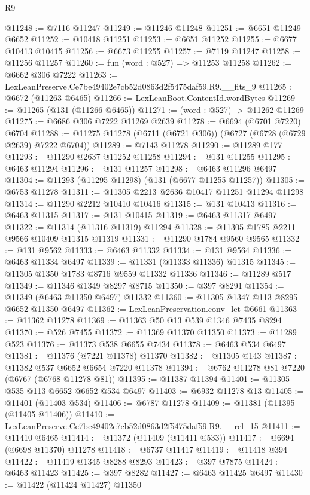 \begin{lexlean}{R9}
\begin{coremodule}
@11248 := @7116 @11247
@11249 := @11246 @11248
@11251 := @6651 @11249 @6652
@11252 := @10418 @11251
@11253 := @6651 @11252
@11255 := @6677 @10413 @10415
@11256 := @6673 @11255
@11257 := @7119 @11247
@11258 := @11256 @11257
@11260 := fun (word : @527) => @11253 @11258
@11262 := @6662 @306 @7222
@11263 := LexLeanPreserve.Ce7be49402e7cb52d0863d2f5475daf59.R9.__fits_9
@11265 := @6672 (@11263 @6465)
@11266 := LexLeanBoot.ContentId.wordBytes
@11269 := @11265 (@131 (@11266 @6465))
@11271 := (word : @527) -> @11262 @11269
@11275 := @6686 @306 @7222 @11269 @2639
@11278 := @6694 (@6701 @7220) @6704
@11288 := @11275 @11278 (@6711 (@6721 @306)) (@6727 (@6728 (@6729 @2639) @7222 @6704))
@11289 := @7143 @11278
@11290 := @11289 @177
@11293 := @11290 @2637 @11252 @11258
@11294 := @131 @11255
@11295 := @6463 @11294
@11296 := @131 @11257
@11298 := @6463 @11296 @6497
@11304 := @11293 (@11295 @11298) (@131 (@6677 @11255 @11257))
@11305 := @6753 @11278
@11311 := @11305 @2213 @2636 @10417 @11251 @11294 @11298
@11314 := @11290 @2212 @10410 @10416
@11315 := @131 @10413
@11316 := @6463 @11315
@11317 := @131 @10415
@11319 := @6463 @11317 @6497
@11322 := @11314 (@11316 @11319) @11294
@11328 := @11305 @1785 @2211 @9566 @10409 @11315 @11319
@11331 := @11290 @1784 @9560 @9565
@11332 := @131 @9562
@11333 := @6463 @11332
@11334 := @131 @9564
@11336 := @6463 @11334 @6497
@11339 := @11331 (@11333 @11336) @11315
@11345 := @11305 @1350 @1783 @8716 @9559 @11332 @11336
@11346 := @11289 @517
@11349 := @11346 @1349 @8297 @8715
@11350 := @397 @8291
@11354 := @11349 (@6463 @11350 @6497) @11332
@11360 := @11305 @1347 @113 @8295 @6652 @11350 @6497
@11362 := LexLeanPreservation.conv_let @6661
@11363 := @11362 @11278
@11369 := @11363 @50 @13 @539 @1346 @7435 @8294
@11370 := @526 @7455
@11372 := @11369 @11370 @11350
@11373 := @11289 @523
@11376 := @11373 @538 @6655 @7434
@11378 := @6463 @534 @6497
@11381 := @11376 (@7221 @11378) @11370
@11382 := @11305 @143
@11387 := @11382 @537 @6652 @6654 @7220 @11378
@11394 := @6762 @11278 @81 @7220 (@6767 (@6768 @11278 @81))
@11395 := @11387 @11394
@11401 := @11305 @535 @113 @6652 @6652 @534 @6497
@11403 := @6932 @11278 @13
@11405 := @11401 (@11403 @534)
@11406 := @6787 @11278
@11409 := @11381 (@11395 (@11405 @11406))
@11410 := LexLeanPreserve.Ce7be49402e7cb52d0863d2f5475daf59.R9.__rel_15
@11411 := @11410 @6465
@11414 := @11372 (@11409 (@11411 @533))
@11417 := @6694 (@6698 @11370) @11278
@11418 := @6737 @11417
@11419 := @11418 @394
@11422 := @11419 @1345 @8288 @8293
@11423 := @397 @7875
@11424 := @6463 @11423
@11425 := @397 @8282
@11427 := @6463 @11425 @6497
@11430 := @11422 (@11424 @11427) @11350

\end{coremodule}
\end{lexlean}
